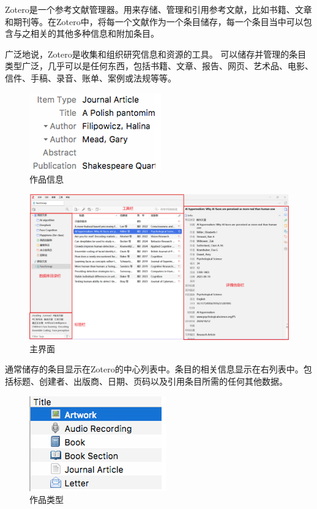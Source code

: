 \documentclass[]{ctexbook}
\theoremstyle{definition}
\theoremstyle{definition}
\theoremstyle{definition}
\theoremstyle{definition}
\theoremstyle{remark}
\begin{document}
Zotero是一个参考文献管理器。用来存储、管理和引用参考文献，比如书籍、文章和期刊等。在Zotero中，将每一个文献作为一个条目储存，每一个条目当中可以包含与之相关的其他多种信息和附加条目。

广泛地说，Zotero是收集和组织研究信息和资源的工具。
可以储存并管理的条目类型广泛，几乎可以是任何东西，包括书籍、文章、报告、网页、艺术品、电影、信件、手稿、录音、账单、案例或法规等等。

\begin{figure}

{\centering \includegraphics[width=0.4\linewidth]{img/zotero/zotero_workInform} 

}

\caption{作品信息}\label{fig:zotero-workInform}
\end{figure}

\begin{figure}

{\centering \includegraphics[width=1\linewidth]{img/zotero/zotero_interface} 

}

\caption{主界面}\label{fig:zotero-interface}
\end{figure}

通常储存的条目显示在Zotero的中心列表中。条目的相关信息显示在右列表中。包括标题、创建者、出版商、日期、页码以及引用条目所需的任何其他数据。

\begin{figure}

{\centering \includegraphics[width=0.4\linewidth]{img/zotero/zotero_worktype} 

}

\caption{作品类型}\label{fig:zotero-worktype}
\end{figure}
\end{document}

